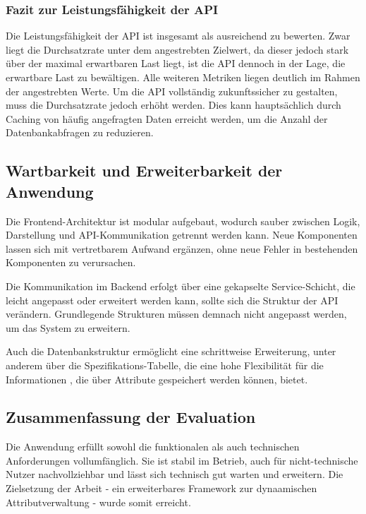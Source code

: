 \subsubsection{Fazit zur Leistungsfähigkeit der API}
Die Leistungsfähigkeit der API ist insgesamt als ausreichend zu bewerten. Zwar liegt die Durchsatzrate unter dem angestrebten Zielwert, da dieser jedoch stark über der maximal erwartbaren Last liegt,
ist die API dennoch in der Lage, die erwartbare Last zu bewältigen. Alle weiteren Metriken liegen deutlich im Rahmen der angestrebten Werte. Um die API vollständig zukunftssicher zu gestalten,
muss die Durchsatzrate jedoch erhöht werden. Dies kann hauptsächlich durch Caching von häufig angefragten Daten erreicht werden, um die Anzahl der Datenbankabfragen zu reduzieren.
\subsection{Wartbarkeit und Erweiterbarkeit der Anwendung}
Die Frontend-Architektur ist modular aufgebaut, wodurch sauber zwischen Logik, Darstellung und API-Kommunikation getrennt werden kann.
Neue Komponenten lassen sich mit vertretbarem Aufwand ergänzen, ohne neue Fehler in bestehenden Komponenten zu verursachen.

Die Kommunikation im Backend erfolgt über eine gekapselte Service-Schicht, die leicht angepasst oder erweitert werden kann, sollte sich die Struktur der 
API verändern. Grundlegende Strukturen müssen demnach nicht angepasst werden, um das System zu erweitern.

Auch die Datenbankstruktur ermöglicht eine schrittweise Erweiterung, unter anderem über die Spezifikations-Tabelle, die eine hohe Flexibilität für die Informationen ,
die über Attribute gespeichert werden können, bietet. 
\subsection{Zusammenfassung der Evaluation}
Die Anwendung erfüllt sowohl die funktionalen als auch technischen Anforderungen vollumfänglich. Sie ist stabil im Betrieb, auch für nicht-technische Nutzer
nachvollziehbar und lässt sich technisch gut warten und erweitern. Die Zielsetzung der Arbeit - ein erweiterbares Framework zur dynaamischen Attributverwaltung - wurde somit erreicht.
